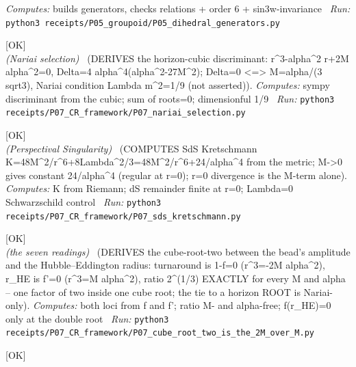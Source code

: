 \begin{description}
\emph{Computes:} builds generators, checks relations + order 6 + sin3w-invariance
\ \emph{Run:} \texttt{python3 receipts/P05\_groupoid/P05\_dihedral\_generators.py}
\item[\label{rcpt:P07_nariai_selection}\texttt{P07\_nariai\_selection}]\hfill\textsf{[OK]}\\
\textit{(Nariai selection)} \ (DERIVES the horizon-cubic discriminant: r\textasciicircum{}3-alpha\textasciicircum{}2 r+2M alpha\textasciicircum{}2=0, Delta=4 alpha\textasciicircum{}4(alpha\textasciicircum{}2-27M\textasciicircum{}2); Delta=0 <=> M=alpha/(3 sqrt3), Nariai condition Lambda m\textasciicircum{}2=1/9 (not asserted)). 
\emph{Computes:} sympy discriminant from the cubic; sum of roots=0; dimensionful 1/9
\ \emph{Run:} \texttt{python3 receipts/P07\_CR\_framework/P07\_nariai\_selection.py}
\item[\label{rcpt:P07_sds_kretschmann}\texttt{P07\_sds\_kretschmann}]\hfill\textsf{[OK]}\\
\textit{(Perspectival Singularity)} \ (COMPUTES SdS Kretschmann K=48M\textasciicircum{}2/r\textasciicircum{}6+8Lambda\textasciicircum{}2/3=48M\textasciicircum{}2/r\textasciicircum{}6+24/alpha\textasciicircum{}4 from the metric; M->0 gives constant 24/alpha\textasciicircum{}4 (regular at r=0); r=0 divergence is the M-term alone). 
\emph{Computes:} K from Riemann; dS remainder finite at r=0; Lambda=0 Schwarzschild control
\ \emph{Run:} \texttt{python3 receipts/P07\_CR\_framework/P07\_sds\_kretschmann.py}
\item[\label{rcpt:P07_cube_root_two_is_the_2M_over_M}\texttt{P07\_cube\_root\_two\_is\_the\_2M\_over\_M}]\hfill\textsf{[OK]}\\
\textit{(the seven readings)} \ (DERIVES the cube-root-two between the bead's amplitude and the Hubble--Eddington radius: turnaround is 1-f=0 (r\textasciicircum{}3=-2M alpha\textasciicircum{}2), r\_HE is f'=0 (r\textasciicircum{}3=M alpha\textasciicircum{}2), ratio 2\textasciicircum{}(1/3) EXACTLY for every M and alpha -- one factor of two inside one cube root; the tie to a horizon ROOT is Nariai-only). 
\emph{Computes:} both loci from f and f'; ratio M- and alpha-free; f(r\_HE)=0 only at the double root
\ \emph{Run:} \texttt{python3 receipts/P07\_CR\_framework/P07\_cube\_root\_two\_is\_the\_2M\_over\_M.py}
\item[\label{rcpt:K1_the_ladder_waiver_is_checked_against_the_continuum}\texttt{K1\_the\_ladder\_waiver\_is\_checked\_against\_the\_continuum}]\hfill\textsf{[OK]}\\

\end{description}
